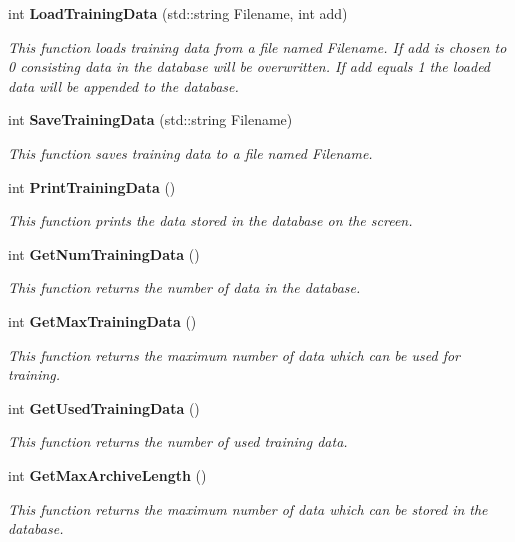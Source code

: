 \begin{CompactItemize}
int {\bf Load\-Training\-Data} (std::string Filename, int add)
\begin{CompactList}\small\item\em This function loads training data from a file named Filename. If add is chosen to 0 consisting data in the database will be overwritten. If add equals 1 the loaded data will be appended to the database.\item\end{CompactList}\item 
int {\bf Save\-Training\-Data} (std::string Filename)
\begin{CompactList}\small\item\em This function saves training data to a file named Filename.\item\end{CompactList}\item 
int {\bf Print\-Training\-Data} ()
\begin{CompactList}\small\item\em This function prints the data stored in the database on the screen.\item\end{CompactList}\item 
int {\bf Get\-Num\-Training\-Data} ()
\begin{CompactList}\small\item\em This function returns the number of data in the database.\item\end{CompactList}\item 
int {\bf Get\-Max\-Training\-Data} ()
\begin{CompactList}\small\item\em This function returns the maximum number of data which can be used for training.\item\end{CompactList}\item 
int {\bf Get\-Used\-Training\-Data} ()
\begin{CompactList}\small\item\em This function returns the number of used training data.\item\end{CompactList}\item 
int {\bf Get\-Max\-Archive\-Length} ()
\begin{CompactList}\small\item\em This function returns the maximum number of data which can be stored in the database.\item\end{CompactList}\item 

\end{CompactItemize}
